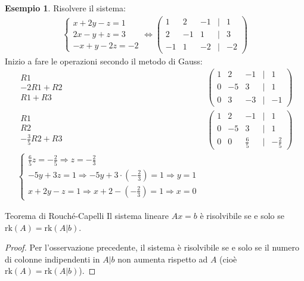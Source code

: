 \documentclass[a4paper]{article}
\theoremstyle{definition}
\newtheorem*{es}{Esempio}
\begin{document}
	\begin{es}
		Risolvere il sistema:
		\begin{align*}
			\begin{cases}
				x + 2y - z = 1 \\
				2x - y + z = 3 \\
				 - x + y - 2z = - 2
			\end{cases} \Leftrightarrow \begin{pmatrix}
				1 & 2 & -1 & \mid & 1  \\
				2 & -1 & 1 & \mid & 3  \\
				-1 & 1 & -2 & \mid & - 2
			\end{pmatrix}
		\end{align*}
		Inizio a fare le operazioni secondo il metodo di Gauss:
		\begin{align*}
			\begin{matrix}
				R1 \\
				 - 2R1 + R2 \\
				 R1 + R3
			\end{matrix} & \begin{pmatrix}
				1 & 2 & -1 & \mid & 1  \\
				0 & -5 & 3 & \mid & 1  \\
				0 & 3 & -3 & \mid & - 1
			\end{pmatrix} \\
			\begin{matrix}
				R1 \\
				R2 \\
				- \frac{3}{5}R2 + R3
			\end{matrix} & \begin{pmatrix}
				1 & 2 & -1 & \mid & 1  \\
				0 & -5 & 3 & \mid & 1  \\
				0 & 0 & \frac{6}{5} & \mid & - \frac{2}{5}
			\end{pmatrix} \\
			\begin{cases}
				\frac{6}{5}z = - \frac{2}{5} \Rightarrow z = - \frac{2}{3} \\
				-5y + 3z = 1 \Rightarrow -5y + 3 \cdot ( - \frac{2}{3}) = 1 \Rightarrow y = 1 \\
				x + 2y - z = 1 \Rightarrow x + 2 - ( - \frac{2}{3}) = 1 \Rightarrow x = 0
			\end{cases}
		\end{align*}
	\end{es}
	\begin{teo}{Teorema di Rouché-Capelli}{}
		Il sistema lineare $Ax = b$ è risolvibile se e solo se $\text{rk}(A) = \text{rk}(A|b)$.
	\end{teo}
	\begin{proof}
		Per l'osservazione precedente, il sistema è risolvibile se e solo se il numero di colonne indipendenti in $A|b$ non aumenta rispetto ad $A$ (cioè $\text{rk}(A) = \text{rk}(A|b)$).
	\end{proof}
\end{document}
